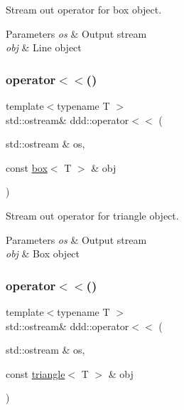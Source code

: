 Stream out operator for box object. 


\begin{DoxyParams}{Parameters}
{\em os} & Output stream \\
\hline
{\em obj} & Line object \\
\hline
\end{DoxyParams}
\mbox{\label{namespaceddd_af710b0f11be50190553c743ce86545a3}} 
\subsubsection{\texorpdfstring{operator$<$$<$()}{operator<<()}\hspace{0.1cm}{\footnotesize\ttfamily [5/10]}}
{\footnotesize\ttfamily template$<$typename T $>$ \\
std\+::ostream\& ddd\+::operator$<$$<$ (\begin{DoxyParamCaption}\item[{std\+::ostream \&}]{os,  }\item[{const \hyperlink{classddd_1_1box}{box}$<$ T $>$ \&}]{obj }\end{DoxyParamCaption})\hspace{0.3cm}{\ttfamily [inline]}}



Stream out operator for triangle object. 


\begin{DoxyParams}{Parameters}
{\em os} & Output stream \\
\hline
{\em obj} & Box object \\
\hline
\end{DoxyParams}
\mbox{\label{namespaceddd_a3a6f828f85e4fa306f0d950f1aab4f64}} 
\subsubsection{\texorpdfstring{operator$<$$<$()}{operator<<()}\hspace{0.1cm}{\footnotesize\ttfamily [6/10]}}
{\footnotesize\ttfamily template$<$typename T $>$ \\
std\+::ostream\& ddd\+::operator$<$$<$ (\begin{DoxyParamCaption}\item[{std\+::ostream \&}]{os,  }\item[{const \hyperlink{classddd_1_1triangle}{triangle}$<$ T $>$ \&}]{obj }\end{DoxyParamCaption})\hspace{0.3cm}{\ttfamily [inline]}}



